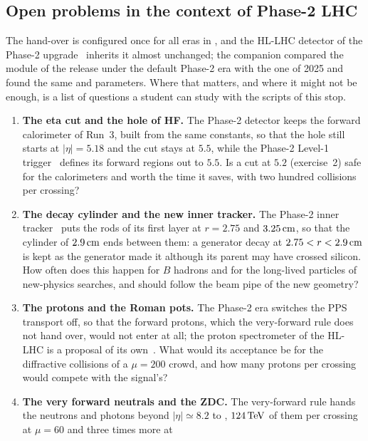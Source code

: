 \subsection*{Open problems in the context of Phase-2 LHC}
\label{sec:crossing_the_border:open_problems}
The hand-over is configured once for all eras in ,
and the HL-LHC detector of the Phase-2 upgrade~\cite{CMS:2015zni} inherits
it almost unchanged; the companion compared the module of the release under
the default Phase-2 era with the one of 2025 and found the same 
and  parameters. Where that matters, and where it might
not be enough, is a list of questions a student can study with the scripts of
this stop.
\begin{enumerate}
  \item \textbf{The eta cut and the hole of HF.} The Phase-2 detector keeps
    the forward calorimeter of Run~3, built from the same constants, so that
    the hole still starts at $|\eta|=5.18$ and the cut stays at $5.5$, while
    the Phase-2 Level-1 trigger~\cite{CMS:2020jkc} defines its forward
    regions out to $5.5$. Is a cut at $5.2$ (exercise~2) safe for the
    calorimeters and worth the time it saves, with two hundred collisions
    per crossing?
  \item \textbf{The decay cylinder and the new inner tracker.} The
    Phase-2 inner tracker~\cite{CMS:2017lum} puts the rods of its first layer
    at $r=2.75$ and $3.25\,\mathrm{cm}$, so that the cylinder of $2.9\,\mathrm{cm}$ ends between
    them: a generator decay at $2.75<r<2.9\,\mathrm{cm}$ is kept as the generator made it
    although its parent may have crossed silicon. How often does this happen
    for $B$ hadrons and for the long-lived particles of new-physics searches,
    and should  follow the beam pipe of the new geometry?
  \item \textbf{The protons and the Roman pots.} The Phase-2 era switches
    the PPS transport off, so that the forward protons, which the very-forward
    rule does not hand over, would not enter \GEANT at all; the proton
    spectrometer of the HL-LHC is a proposal of its own~\cite{CMS:2021ncv}.
    What would its acceptance be for the diffractive collisions of a
    $\mu=200$ crowd, and how many protons per crossing would compete with
    the signal's?
    \item \textbf{The very forward neutrals and the ZDC.} The very-forward
    rule hands the neutrons and photons beyond $|\eta|\simeq8.2$ to \GEANT,
    $124\,\mathrm{TeV}$ of them per crossing at $\mu=60$ and three times more at

\end{enumerate}

